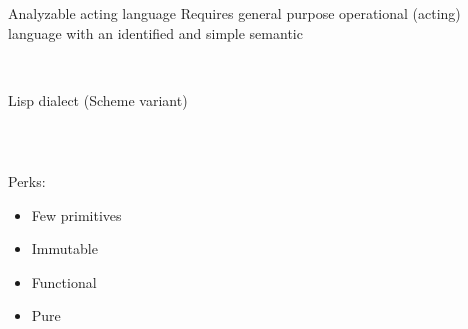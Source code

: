 \begin{frame}{Analyzable acting language}
    Requires general purpose operational (acting) language with an identified and simple semantic

    ~

    \begin{center}
        Lisp dialect (Scheme variant) \cite{moretti1979lambda}
    \end{center}
    
    ~

    \begin{columns}
        \begin{column}{0.45\textwidth}
            Perks:
            \begin{itemize}
                \item Few primitives
                \item Immutable
                \item Functional
                \item Pure
            \end{itemize}
        \end{column}
    \end{columns} 
\end{frame}

